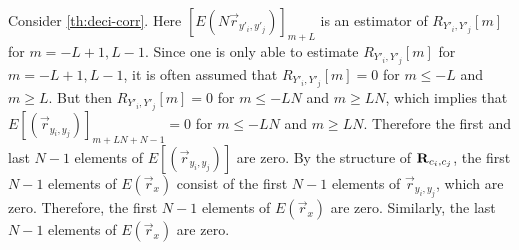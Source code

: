 \documentclass[a4paper, openany, oneside]{memoir}
\begin{document}
Consider \cref{th:deci-corr}. Here $[E(N \vec{r}_{y'_i,y'_j})]_{m + L}$ is an estimator of $R_{Y'_i,Y'_j}[m]$ for $m = -L+1,L-1$. Since one is only able to estimate $R_{Y'_i,Y'_j}[m]$ for $m=-L+1,L-1$, it is often assumed that $R_{Y'_i,Y'_j}[m]=0$ for $m \le -L$ and $m \ge L$. But then $R_{Y'_i,Y'_j}[m]=0$ for $m \le -LN$ and $m \ge LN$, which implies that $E[(\vec{r}_{y_i,y_j})]_{m+LN + N-1}=0$ for $m \le -LN$ and $m \ge LN$. Therefore the first and last $N-1$ elements of $E[(\vec{r}_{y_i,y_j})]$ are zero. By the structure of $\boldsymbol{\mathbf{R}}_{c_i,c_j}$, the first $N-1$ elements of $E(\vec{r}_x)$ consist of the first $N-1$ elements of $\vec{r}_{y_i,y_j}$, which are zero. Therefore, the first $N-1$ elements of $E(\vec{r}_x)$ are zero. Similarly, the last $N-1$ elements of $E(\vec{r}_x)$ are zero.



\end{document}
